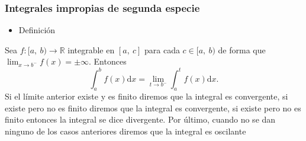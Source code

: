 \subsubsection{Integrales impropias de segunda especie}
\begin{itemize}[label=\color{red}\textbullet, leftmargin=*]
	\item \color{lightblue}Definición
\end{itemize}
Sea $f:[a,~b)\rightarrow\mathbb{R}$ integrable en $[a,~c]$ para cada $c\in[a,~b)$ de forma que $\lim_{x\to b^-}f(x)=\pm\infty$. Entonces $$\int_{a}^{b}f(x)\mathrm{d}x=\lim_{t\to b^-}\int_{a}^{t}f(x)\mathrm{d}x.$$ Si el límite anterior existe y es finito diremos que la integral es convergente, si existe pero no es finito diremos que la integral es convergente, si existe pero no es finito entonces la integral se dice divergente. Por último, cuando no se dan ninguno de los casos anteriores diremos que la integral es oscilante
